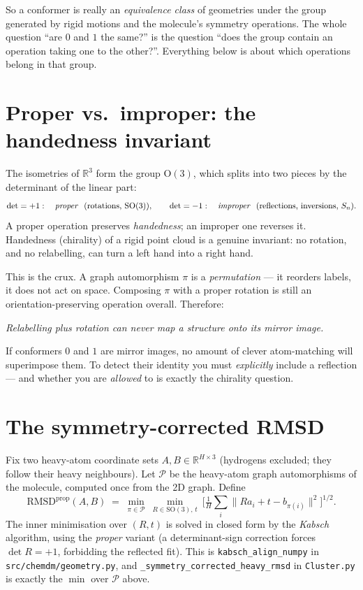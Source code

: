 \documentclass[11pt]{article}
\newcommand{\R}{\mathbb{R}}
\newcommand{\SO}{\mathrm{SO}(3)}
\newcommand{\Ordn}{\mathrm{O}(3)}
\newcommand{\rmsd}{\mathrm{RMSD}}
\begin{document}
So a conformer is really an \emph{equivalence class} of geometries under the
group generated by rigid motions and the molecule's symmetry operations. The
whole question ``are $0$ and $1$ the same?'' is the question ``does the group
contain an operation taking one to the other?''. Everything below is about
which operations belong in that group.

\section{Proper vs.\ improper: the handedness invariant}

The isometries of $\R^3$ form the group $\Ordn$, which splits into two pieces
by the determinant of the linear part:
\[
  \det = +1:\quad \text{\emph{proper}} \ \ (\text{rotations, } \SO),
  \qquad
  \det = -1:\quad \text{\emph{improper}} \ \ (\text{reflections, inversions, } S_n).
\]
A proper operation preserves \emph{handedness}; an improper one reverses it.
Handedness (chirality) of a rigid point cloud is a genuine invariant: no
rotation, and no relabelling, can turn a left hand into a right hand.

This is the crux. A graph automorphism $\pi$ is a \emph{permutation} --- it
reorders labels, it does not act on space. Composing $\pi$ with a proper
rotation is still an orientation-preserving operation overall. Therefore:

\begin{center}
\emph{Relabelling plus rotation can never map a structure onto its mirror
image.}
\end{center}

If conformers $0$ and $1$ are mirror images, no amount of clever atom-matching
will superimpose them. To detect their identity you must \emph{explicitly}
include a reflection --- and whether you are \emph{allowed} to is exactly the
chirality question.

\section{The symmetry-corrected RMSD}

Fix two heavy-atom coordinate sets $A,B\in\R^{H\times 3}$ (hydrogens excluded;
they follow their heavy neighbours). Let $\mathcal{P}$ be the heavy-atom graph
automorphisms of the molecule, computed once from the 2D graph. Define
\[
  \rmsd^{\text{prop}}(A,B)
  \;=\;
  \min_{\pi\in\mathcal{P}} \ \min_{R\in\SO,\,t}
  \ \Big[\tfrac{1}{H}\textstyle\sum_i \| R a_i + t - b_{\pi(i)}\|^2\Big]^{1/2}.
\]
The inner minimisation over $(R,t)$ is solved in closed form by the
\emph{Kabsch} algorithm, using the \emph{proper} variant (a determinant-sign
correction forces $\det R=+1$, forbidding the reflected fit). This is
\texttt{kabsch\_align\_numpy} in \texttt{src/chemdm/geometry.py}, and
\texttt{\_symmetry\_corrected\_heavy\_rmsd} in \texttt{Cluster.py} is exactly
the $\min$ over $\mathcal{P}$ above.
\end{document}
